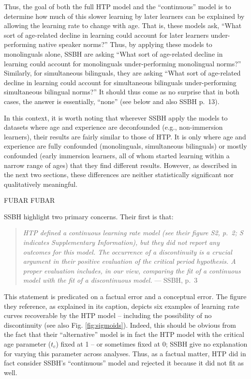 \documentclass[
  english,
  doc,floatsintext]{apa6}
\begin{document}
Thus, the goal of both the full HTP model and the ``continuous'' model is to determine how much of this slower learning by later learners can be explained by allowing the learning rate to change with age. That is, these models ask, ``What sort of age-related decline in learning could account for later learners under-performing native speaker norms?'' Thus, by applying these models to monolinguals alone, SSBH are asking ``What sort of age-related decline in learning could account for monolinguals under-performing monolingual norms?'' Similarly, for simultaneous bilinguals, they are asking ``What sort of age-related decline in learning could account for simultaneous bilinguals under-performing simultaneous bilingual norms?'' It should thus come as no surprise that in both cases, the answer is essentially, ``none'' (see below and also SSBH p.~13).

In this context, it is worth noting that wherever SSBH apply the models to datasets where age and experience are deconfounded (e.g., non-immersion learners), their results are fairly similar to those of HTP. It is only where age and experience are fully confounded (monolinguals, simultaneous bilinguals) or mostly confounded (early immersion learners, all of whom started learning within a narrow range of ages) that they find different results. However, as described in the next two sections, these differences are neither statistically significant nor qualitatively meaningful.

FUBAR FUBAR

SSBH highlight two primary concerns. Their first is that:

\begin{quote}
\emph{HTP defined a continuous learning rate model (see their figure S2, p.~2; S indicates Supplementary Information), but they did not report any outcomes for this model. The occurrence of a discontinuity is a crucial argument in their positive evaluation of the critical period hypothesis. A proper evaluation includes, in our view, comparing the fit of a continuous model with the fit of a discontinuous model.}
\hfill --- SSBH, p.~3
\end{quote}

This statement is predicated on a factual error and a conceptual error. The figure they reference, as explained in its caption, depicts six examples of learning rate curves recoverable by the HTP model -- including the possibility of no discontinuity (see also Fig. \ref{fig:sigmoids}). Indeed, this should be obvious from the fact that their ``alternative'' model is in fact the HTP model with the critical age parameter (\(t_c\)) fixed at 1 -- or sometimes fixed at 0; SSBH give no explanation for varying this parameter across analyses. Thus, as a factual matter, HTP did in fact consider SSBH's ``continuous'' model and rejected it because it did not fit as well.
\end{document}
